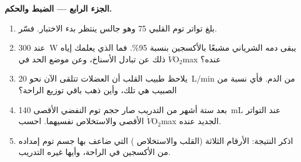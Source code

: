 \begin{problem}
\medskip
\noindent\textbf{الجزء الرابع --- الضبط والحكم.}
\begin{enumerate}[resume]
  \item بلغ تواتر توم القلبي 75 وهو جالس ينتظر بدء الاختبار. فسّر.
  \item عند \qty{300}{W} يبقى دمه الشرياني مشبعًا بالأكسجين بنسبة
        95\%. فما الذي يعلمك إياه ذلك عن تبادل الأسناخ، وعن موضع الحد
        في $\dot V\!\mathrm{O_2}$max عنده؟
  \item يلاحظ طبيب القلب أن العضلات تتلقى الآن نحو \qty{20}{L/min} من
        الدم. فأي نسبة من الصبيب هي تلك، وأين ذهب باقي توزيع الراحة؟
  \item بعد ستة أشهر من التدريب صار حجم توم النفضي الأقصى
        \qty{140}{mL} عند التواتر الأقصى والاستخلاص نفسيهما. احسب
        $\dot V\!\mathrm{O_2}$max الجديد عنده.
  \item اذكر النتيجة: الأرقام الثلاثة (القلب والاستخلاص )
        التي ضاعف بها جسم توم إمداده من الأكسجين في الراحة، وأيها
        غيره التدريب.
\end{enumerate}
\end{problem}
